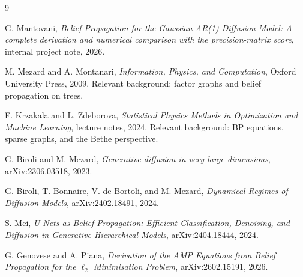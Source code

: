 \documentclass[11pt]{article}
\begin{document}
\begin{thebibliography}{9}

G. Mantovani, \emph{Belief Propagation for the Gaussian AR(1) Diffusion Model: A complete derivation and numerical comparison with the precision-matrix score}, internal project note, 2026.

M. Mezard and A. Montanari, \emph{Information, Physics, and Computation}, Oxford University Press, 2009. Relevant background: factor graphs and belief propagation on trees.

F. Krzakala and L. Zdeborova, \emph{Statistical Physics Methods in Optimization and Machine Learning}, lecture notes, 2024. Relevant background: BP equations, sparse graphs, and the Bethe perspective.

G. Biroli and M. Mezard, \emph{Generative diffusion in very large dimensions}, arXiv:2306.03518, 2023.

G. Biroli, T. Bonnaire, V. de Bortoli, and M. Mezard, \emph{Dynamical Regimes of Diffusion Models}, arXiv:2402.18491, 2024.

S. Mei, \emph{U-Nets as Belief Propagation: Efficient Classification, Denoising, and Diffusion in Generative Hierarchical Models}, arXiv:2404.18444, 2024.

G. Genovese and A. Piana, \emph{Derivation of the AMP Equations from Belief Propagation for the \(\ell_2\) Minimisation Problem}, arXiv:2602.15191, 2026.

\end{thebibliography}
\end{document}
